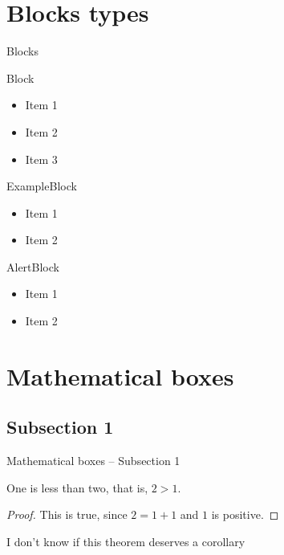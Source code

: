 \section{Blocks types}
\begin{frame}{Blocks}
    \begin{block}{Block}
        \begin{itemize}
            [triangle]
            \item Item 1
            \item<1> Item 2
            \item<2> Item 3
        \end{itemize}
    \end{block}

    \begin{exampleblock}{ExampleBlock}
        \begin{itemize}
            [square]
            \item Item 1
            \item Item 2
        \end{itemize}
    \end{exampleblock}

    \begin{alertblock}{AlertBlock}
        \begin{itemize}
            [cercle]
            \item Item 1
            \item Item 2
        \end{itemize}
    \end{alertblock}
\end{frame}
%
\section{Mathematical boxes}
\subsection{Subsection 1}
\begin{frame}{Mathematical boxes -- Subsection 1}
    \begin{theorem}
        One is less than two, that is, $2>1$.
    \end{theorem}

    \begin{proof}
        This is true, since $2=1+1$ and $1$ is positive.
    \end{proof}
    
    \begin{corollary}
        I don’t know if this theorem deserves a corollary
    \end{corollary}
\end{frame}
%

